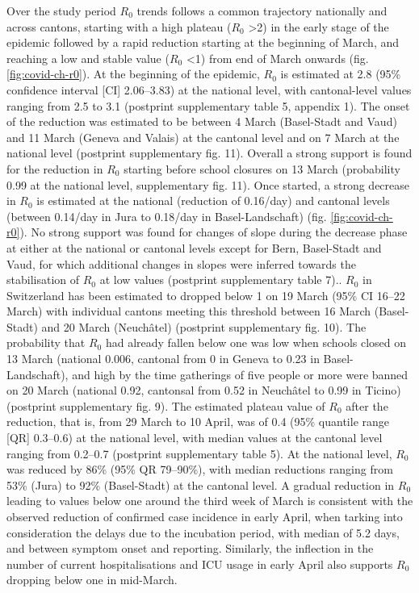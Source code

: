 Over the study period $R_0$ trends follows a common trajectory nationally and across cantons, starting with a high plateau ($R_0$ >2) in the early stage of the epidemic followed by a rapid reduction starting at the beginning of March, and reaching a low and stable value ($R_0$ <1) from end of March onwards (fig. \ref{fig:covid-ch-r0}). At the beginning of the epidemic, $R_0$ is estimated at 2.8 (95\% confidence interval [CI] 2.06–3.83) at the national level, with cantonal-level values ranging from 2.5 to 3.1 (postprint supplementary table 5, appendix 1). The onset of the reduction was estimated to be between 4 March (Basel-Stadt and Vaud) and 11 March (Geneva and Valais) at the cantonal level and on 7 March at the national level (postprint supplementary fig. 11). Overall a strong support is found for the reduction in $R_0$ starting before school closures on 13 March (probability 0.99 at the national level, supplementary fig. 11). Once started, a strong decrease in $R_0$ is estimated at the national (reduction of 0.16/day) and cantonal levels (between 0.14/day in Jura to 0.18/day in Basel-Landschaft) (fig. \ref{fig:covid-ch-r0}). No strong support was found for changes of slope during the decrease phase at either at the national or cantonal levels except for Bern, Basel-Stadt and Vaud, for which additional changes in slopes were inferred towards the stabilisation of $R_0$ at low values (postprint supplementary table 7).. $R_0$ in Switzerland has been estimated to dropped below 1 on 19 March (95\% CI 16–22 March) with individual cantons meeting this threshold between 16 March (Basel-Stadt) and 20 March (Neuchâtel) (postprint supplementary fig. 10). The probability that $R_0$ had already fallen below one was low when schools closed on 13 March (national 0.006, cantonal from 0 in Geneva to 0.23 in Basel-Landschaft), and high by the time gatherings of five people or more were banned on 20 March (national 0.92, cantonsal from 0.52 in Neuchâtel to 0.99 in Ticino) (postprint supplementary fig. 9). The estimated plateau value of $R_0$ after the reduction, that is, from 29 March to 10 April, was of 0.4 (95\% quantile range [QR] 0.3–0.6) at the national level, with median values at the cantonal level ranging from 0.2–0.7 (postprint supplementary table 5). At the national level, $R_0$ was reduced by 86\% (95\% QR 79–90\%), with median reductions ranging from 53\% (Jura) to 92\% (Basel-Stadt) at the cantonal level. A gradual reduction in $R_0$ leading to values below one around the third week of March is consistent with the observed reduction of confirmed case incidence in early April, when tarking into consideration the delays due to the incubation period, with median of 5.2 days\cite[-5\baselineskip]{Lauer:IncubationPeriodCoronavirus:2020}, and between symptom onset and reporting\cite[-2\baselineskip]{Bi:EpidemiologyTransmissionCOVID19:2020}. Similarly, the inflection in the number of current hospitalisations and ICU usage in early April also supports $R_0$ dropping below one in mid-March. 

